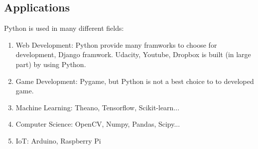     \subsection{Applications}
        Python is used in many different fields: 
        \begin{enumerate}
            \item Web Development: Python provide many framworks to choose for development, Django framwork. Udacity, Youtube, Dropbox is built (in large part) by using Python.
            \item Game Development: Pygame, but Python is not a best choice to to developed game.
            \item Machine Learning: Theano, Tensorflow, Scikit-learn... 
            \item Computer Science: OpenCV, Numpy, Pandas, Scipy... 
            \item IoT: Arduino, Raspberry Pi 
        \end{enumerate}

